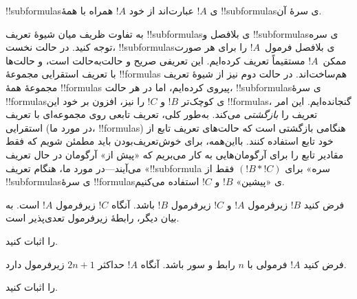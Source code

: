 \documentclass[../../../include/open-logic-section]{subfiles}
\begin{document}
\begin{defn}[!!^{subformula}]
!!{subformula}sی $!A$ عبارت‌اند از خود $!A$ همراه با همهٔ
!!{subformula}sی سرهٔ آن.
\end{defn}

\begin{explain}
به تفاوت ظریف میان شیوهٔ تعریف !!{subformula}sی بلافصل و
!!{subformula}sی سره توجه کنید. در حالت نخست، !!{subformula}sی بلافصل
فرمول~$!A$ را برای هر صورت ممکن~$!A$ مستقیماً تعریف کرده‌ایم. این تعریفی
صریح و حالت‌به‌حالت است، و حالت‌ها با تعریف استقرایی مجموعهٔ !!{formula}s
هم‌ساخت‌اند. در حالت دوم نیز از شیوهٔ تعریف مجموعهٔ همهٔ !!{formula}s
پیروی کرده‌ایم، اما در هر حالت، !!{subformula}sی سرهٔ !!{formula}sی
کوچک‌تر $!B$ و $!C$ را نیز، افزون بر خود این !!{formula}s، گنجانده‌ایم.
این امر تعریف را
\emph{بازگشتی} می‌کند. به‌طور کلی، تعریف تابعی روی مجموعه‌ای با تعریف
استقرایی (در مورد ما، !!{formula}s) هنگامی بازگشتی است که حالت‌های تعریف
تابع از خود تابع استفاده کنند. بااین‌همه، برای خوش‌تعریف‌بودن باید مطمئن
شویم که فقط مقادیر تابع را برای آرگومان‌هایی به کار می‌بریم که «پیش از»
آرگومان در حال تعریف می‌آیند---در مورد ما، هنگام تعریف «!!{subformula}
سره» برای $(!B \ast !C)$ فقط از !!{subformula}sی سرهٔ !!{formula}sی
«پیشین» $!B$ و $!C$ استفاده می‌کنیم.
\end{explain}

\begin{prop}
فرض کنید $!B$ زیر‌فرمول $!A$ و $!C$ زیر‌فرمول $!B$ باشد. آنگاه $!C$
زیر‌فرمول $!A$ است. به بیان دیگر، رابطهٔ زیر‌فرمول تعدی‌پذیر است.
\end{prop}

\begin{prob}
 را اثبات کنید.
\end{prob}

\begin{prop}
فرض کنید $!A$ فرمولی با $n$ رابط و سور باشد. آنگاه $!A$ حداکثر
$2n+1$ زیر‌فرمول دارد.
\end{prop}

\begin{prob}
 را اثبات کنید.
\end{prob}
\end{document}
